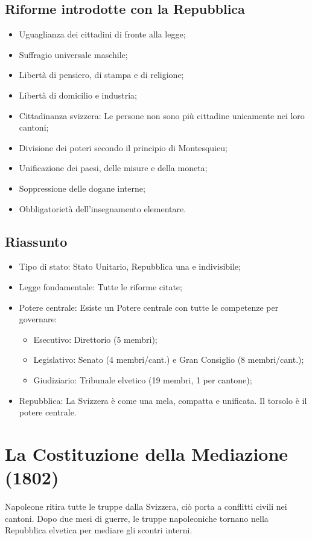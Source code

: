 \documentclass{article}
\begin{document}
\subsection{Riforme introdotte con la Repubblica}
\begin{itemize}
    \item Uguaglianza dei cittadini di fronte alla legge;
    \item Suffragio universale maschile;
    \item Libertà di pensiero, di stampa e di religione;
    \item Libertà di domicilio e industria;
    \item Cittadinanza svizzera: Le persone non sono più cittadine unicamente nei loro cantoni;
    \item Divisione dei poteri secondo il principio di Montesquieu;
    \item Unificazione dei paesi, delle misure e della moneta;
    \item Soppressione delle dogane interne;
    \item Obbligatorietà dell’insegnamento elementare.
\end{itemize}

\subsection{Riassunto}
\begin{itemize}
    \item Tipo di stato: Stato Unitario, Repubblica una e indivisibile;
    \item Legge fondamentale: Tutte le riforme citate;
    \item Potere centrale: Esiste un Potere centrale con tutte le competenze per governare:
    \begin{itemize}
        \item Esecutivo: Direttorio (5 membri);
        \item Legislativo: Senato (4 membri/cant.) e Gran Consiglio (8 membri/cant.);
        \item Giudiziario: Tribunale elvetico (19 membri, 1 per cantone);
    \end{itemize}
    \item Repubblica: La Svizzera è come una mela, compatta e unificata. Il torsolo è il potere
        centrale.
\end{itemize}

\newpage
\section{La Costituzione della Mediazione (1802)}
Napoleone ritira tutte le truppe dalla Svizzera, ciò porta a conflitti civili nei cantoni.
Dopo due mesi di guerre, le truppe napoleoniche tornano nella Repubblica elvetica per mediare
gli scontri interni.
\end{document}
